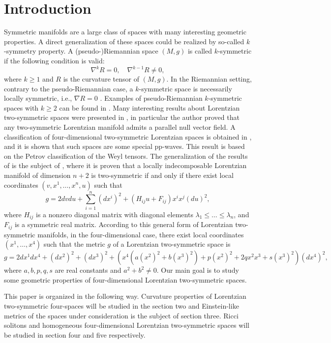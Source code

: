 \documentclass[11pt,oneside,leqno]{amsart}
\theoremstyle{plain}
\begin{document}
\section{Introduction}
Symmetric manifolds are a large class of spaces with many interesting geometric properties. A direct generalization of these
spaces could be realized by so-called $k$-symmetry property. A (pseudo-)Riemannian space $(M, g)$ is called $k$-symmetric if the following condition is valid:
$$
\nabla^kR=0,\quad\nabla^{k-1}R\neq0,
$$
where $k\geq1$ and $R$ is the curvature tensor of $(M,g)$. In the Riemannian setting, contrary to the pseudo-Riemannian case, a $k$-symmetric space is necessarily locally symmetric, i.e., $\nabla R=0$ \cite{Ta}. Examples of pseudo-Riemannian $k$-symmetric spaces with $k\geq2$ can be found in \cite{Se,Bl,Ka}. Many interesting results about Lorentzian two-symmetric spaces were presented in \cite{Se}, in particular the author proved that any two-symmetric Lorentzian manifold admits a parallel null vector field. A classification of four-dimensional two-symmetric Lorentzian spaces is obtained in \cite{Bl}, and it is shown that such spaces are some special pp-waves. This result is based on the Petrov classification of the Weyl tensors. The generalization of the results of \cite{Bl} is the subject of \cite{Al}, where it is proven that a locally indecomposable Lorentzian manifold of dimension $n+2$ is two-symmetric if and only if there exist local coordinates $(v,x^1,\dots,x^n,u)$ such that
\begin{equation}\label{g0}
g=2dvdu+\sum_{i=1}^n(dx^i)^2+(H_{ij}u+F_{ij})x^ix^j(du)^2,
\end{equation}
where $H_{ij}$ is a nonzero diagonal matrix with diagonal elements $\lambda_1\leq\dots\leq\lambda_n$, and $F_{ij}$ is a symmetric real matrix. According to this general form of Lorentzian two-symmetric manifolds, in the four-dimensional case, there exist local coordinates $(x^1,\dots,x^4)$ such that the metric $g$ of a Lorentzian two-symmetric space is
\begin{equation}\label{g}
g=2dx^1dx^4+(dx^2)^2+(dx^3)^2+\left(x^4(a(x^2)^2+b(x^3)^2)+p(x^2)^2+2qx^2x^3+s(x^3)^2\right)(dx^4)^2,
\end{equation}
where $a,b,p,q,s$ are real constants and $a^2+b^2\neq0$. Our main goal is to study some geometric properties of four-dimensional Lorentzian two-symmetric spaces.

This paper is organized in the following way. Curvature properties of Lorentzian two-symmetric four-spaces will be studied in the section two and Einstein-like metrics of the spaces under consideration is the subject of section three. Ricci solitons and homogeneous four-dimensional Lorentzian two-symmetric spaces will be studied in section four and five respectively.
\end{document}
